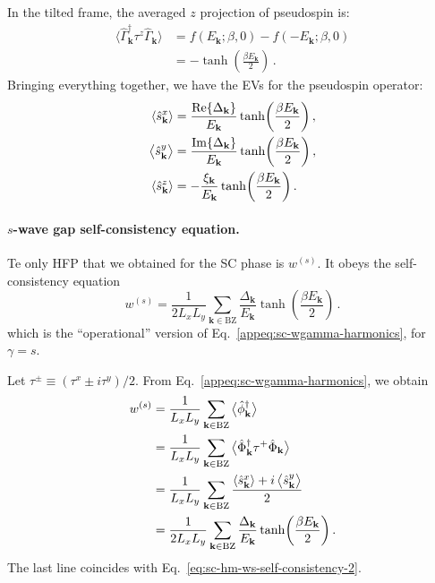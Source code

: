 In the tilted frame, the averaged $z$ projection of pseudospin is:
\begin{align}
	\langle \hat \Gamma_\mathbf{k}^\dagger \tau^z \hat \Gamma_\mathbf{k} \rangle &=
	f\left(
	E_\mathbf{k};\beta,0
	\right) - f\left(
	-E_\mathbf{k};\beta,0
	\right) \nonumber \\
	&= - \tanh(\frac{\beta E_\mathbf{k}}{2}) \, .
	\label{eq:sc-<z>}
\end{align}
Bringing everything together, we have the EVs for the pseudospin operator:
\begin{align}
	\ev{\hat s_\mathbf{k}^x} &= \frac{\Re \lbrace \Delta_\mathbf{k} \rbrace}{E_\mathbf{k}} \tanh(\frac{\beta E_\mathbf{k}}{2}) \, , \label{eq:sc-hm-sx}\\
	\ev{\hat s_\mathbf{k}^y} &= \frac{\Im \lbrace \Delta_\mathbf{k} \rbrace}{E_\mathbf{k}} \tanh(\frac{\beta E_\mathbf{k}}{2}) \, , \label{eq:sc-hm-sy}\\
	\ev{\hat s_\mathbf{k}^z} &=  -\frac{\xi_\mathbf{k}}{E_\mathbf{k}}  \tanh(\frac{\beta E_\mathbf{k}}{2}) \, . \label{eq:sc-hm-sz}
\end{align}

\paragraph{$s$-wave gap self-consistency equation.}

Te only HFP that we obtained for the SC phase is $w^{(s)}$. It obeys the self-consistency equation
\begin{equation}\label{eq:sc-hm-ws-self-consistency-2}
	w^{(s)} = \frac{1}{2 L_x L_y} \sum_{\mathbf{k}\in\mathrm{BZ}} \frac{\Delta_\mathbf{k}}{E_\mathbf{k}} \tanh(\frac{\beta E_\mathbf{k}}{2}) \, .
\end{equation}
which is the ``operational'' version of Eq.~\eqref{appeq:sc-wgamma-harmonics}, for $\gamma=s$.

\begin{tabproof}
	
	Let $\tau^\pm \equiv (\tau^x \pm i \tau^y)/2$. From Eq.~\eqref{appeq:sc-wgamma-harmonics}, we obtain
	\[
	\begin{aligned}
		w^{(s)} &= \frac{1}{L_x L_y} \sum_{\mathbf{k}\in\mathrm{BZ}} \big\langle
		\hat \phi_\mathbf{k}^\dagger
		\big\rangle \\
		&= \frac{1}{L_x L_y} \sum_{\mathbf{k}\in\mathrm{BZ}} \big\langle
		\hat \Phi_\mathbf{k}^\dagger \tau^+ \hat \Phi_\mathbf{k}
		\big\rangle \\
		&= \frac{1}{L_x L_y} \sum_{\mathbf{k}\in\mathrm{BZ}} \frac{	
			\ev{\hat s_\mathbf{k}^x} + i \ev{\hat s_\mathbf{k}^y}
		}{2} \nonumber \\
		&= \frac{1}{2 L_x L_y} \sum_{\mathbf{k}\in\mathrm{BZ}} \frac{\Delta_\mathbf{k}}{E_\mathbf{k}} \tanh(\frac{\beta E_\mathbf{k}}{2}) \, .
	\end{aligned}
	\]
	The last line coincides with Eq.~\eqref{eq:sc-hm-ws-self-consistency-2}.
\end{tabproof}

